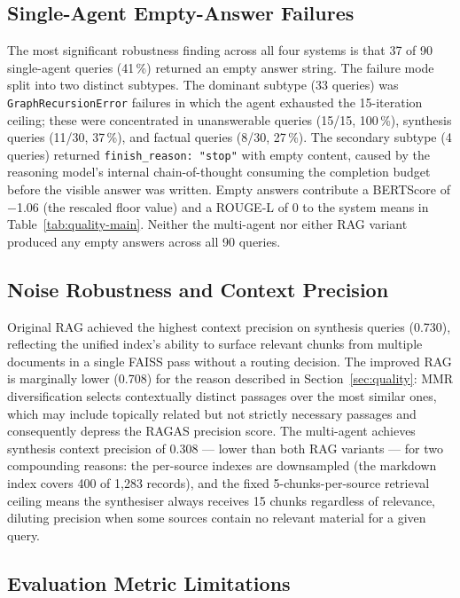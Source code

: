 \subsection*{Single-Agent Empty-Answer Failures}

The most significant robustness finding across all four systems is that 37 of 90 single-agent queries (41\,\%) returned an empty answer string. The failure mode split into two distinct subtypes. The dominant subtype (33 queries) was \texttt{GraphRecursionError} failures in which the agent exhausted the 15-iteration ceiling; these were concentrated in unanswerable queries (15/15, 100\,\%), synthesis queries (11/30, 37\,\%), and factual queries (8/30, 27\,\%). The secondary subtype (4 queries) returned \texttt{finish\_reason: "stop"} with empty content, caused by the reasoning model's internal chain-of-thought consuming the completion budget before the visible answer was written. Empty answers contribute a BERTScore of $-$1.06 (the rescaled floor value) and a ROUGE-L of 0 to the system means in Table~\ref{tab:quality-main}. Neither the multi-agent nor either RAG variant produced any empty answers across all 90 queries.

\subsection*{Noise Robustness and Context Precision}

Original RAG achieved the highest context precision on synthesis queries (0.730), reflecting the unified index's ability to surface relevant chunks from multiple documents in a single FAISS pass without a routing decision. The improved RAG is marginally lower (0.708) for the reason described in Section~\ref{sec:quality}: MMR diversification selects contextually distinct passages over the most similar ones, which may include topically related but not strictly necessary passages and consequently depress the RAGAS precision score. The multi-agent achieves synthesis context precision of 0.308 — lower than both RAG variants — for two compounding reasons: the per-source indexes are downsampled (the markdown index covers 400 of 1,283 records), and the fixed 5-chunks-per-source retrieval ceiling means the synthesiser always receives 15 chunks regardless of relevance, diluting precision when some sources contain no relevant material for a given query.

\subsection*{Evaluation Metric Limitations}

